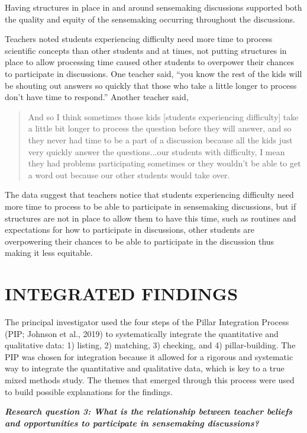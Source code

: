 \documentclass{sig-alternate} %
\begin{document}
\begin{large}
Having structures in place in and around sensemaking discussions supported both the quality and equity of the sensemaking occurring throughout the discussions. 

Teachers noted students experiencing difficulty need more time to process scientific concepts than other students and at times, not putting structures in place to allow processing time caused other students to overpower their chances to participate in discussions. One teacher said, “you know the rest of the kids will be shouting out answers so quickly that those who take a little longer to process don't have time to respond.” Another teacher said, 

\begin{quote}
And so I think sometimes those kids [students experiencing difficulty] take a little bit longer to process the question before they will answer, and so they never had time to be a part of a discussion because all the kids just very quickly answer the questions...our students with difficulty, I mean they had problems participating sometimes or they wouldn’t be able to get a word out because our other students would take over. 
\end{quote}

The data suggest that teachers notice that students experiencing difficulty need more time to process to be able to participate in sensemaking discussions, but if structures are not in place to allow them to have this time, such as routines and expectations for how to participate in discussions, other students are overpowering their chances to be able to participate in the discussion thus making it less equitable.

\section*{INTEGRATED FINDINGS}
The principal investigator used the four steps of the Pillar Integration Process (PIP; Johnson et al., 2019) to systematically integrate the quantitative and qualitative data: 1) listing, 2) matching, 3) checking, and 4) pillar-building. The PIP was chosen for integration because it allowed for a rigorous and systematic way to integrate the quantitative and qualitative data, which is key to a true mixed methods study. 	The themes that emerged through this process were used to build possible explanations for the findings.

\textbf{\textit{Research question 3: What is the relationship between teacher beliefs and opportunities to participate in sensemaking discussions?}}


\end{large}
\end{document}
